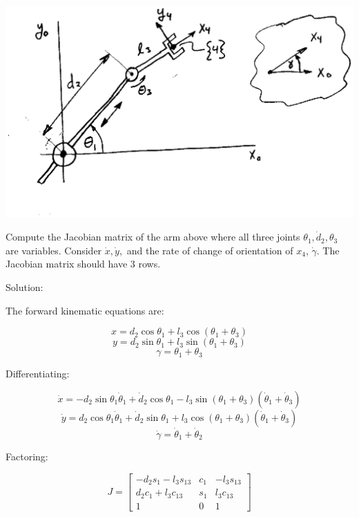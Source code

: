 \begin{ExampleSmall}\label{ExJacob}

\includegraphics{figs04/00087.eps}

Compute the Jacobian matrix of the arm above where all three joints
$\theta_1, \dot{d}_2, \theta_3$ are variables.
Consider $\dot{x}, \dot{y},$ and the rate of change of
orientation of $x_4$, $\dot{\gamma}$. The Jacobian matrix
should have 3 rows.


Solution:


The forward kinematic equations are:

\[
x = d_{2}\cos\theta_{1}+ l_{3}\cos(\theta_1+\theta_3)
\]
\[
y = d_{2}\sin\theta_{1}+ l_{3}\sin(\theta_1+\theta_3)
\]
\[
\gamma=\theta_1+\theta_3
\]

Differentiating:

\[
\dot{x}= -d_{2}\sin\theta_1 \dot{\theta}_1
+\dot{d}_2\cos\theta_1
-l_{3}\sin(\theta_1+\theta_3)(\dot{\theta}_1+\dot{\theta}_3)
\]
\[
\dot{y}= d_{2}\cos\theta_1 \dot{\theta}_1
+\dot{d}_2\sin\theta_1
+l_{3}\cos(\theta_1+\theta_3)(\dot{\theta}_1+\dot{\theta}_3)
\]
\[
\dot{\gamma}=\dot{\theta}_1 + \dot{\theta}_2
\]

Factoring:

\[
J = \left[ \begin{array}{ccc}
-d_2s_1-l_3s_{13} & c_1 & -l_3s_{13} \\
d_2c_1+l_3c_{13} & s_1 & l_3c_{13} \\
1 & 0 & 1
\end{array}
\right]
\]
\end{ExampleSmall}




